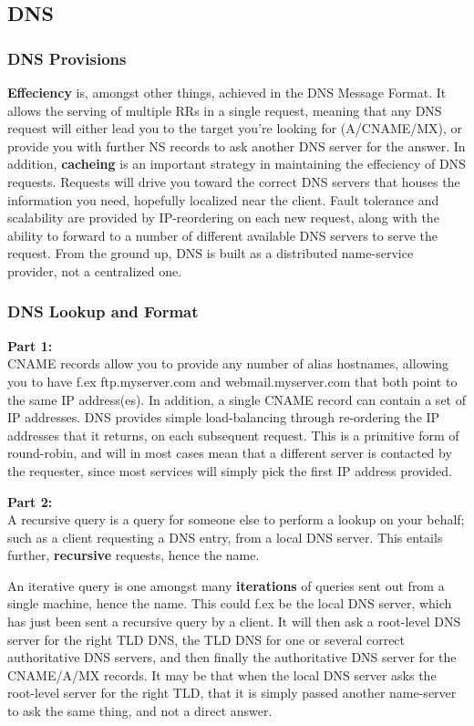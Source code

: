 \subsection{DNS}
\subsubsection{DNS Provisions}
\textbf{Effeciency} is, amongst other things, achieved in the DNS Message Format. It allows the serving of multiple RRs 
in a single request, meaning that any DNS request will either lead you to the target you're looking for (A/CNAME/MX), or
provide you with further NS records to ask another DNS server for the answer. In addition, \textbf{cacheing} is an important
strategy in maintaining the effeciency of DNS requests. Requests will drive you toward the correct DNS servers that
houses the information you need, hopefully localized near the client. Fault tolerance and scalability are provided by IP-reordering
on each new request, along with the ability to forward to a number of different available DNS servers to serve the request. From the ground
up, DNS is built as a distributed name-service provider, not a centralized one.

\subsubsection{DNS Lookup and Format}
\textbf{Part 1:}\\
CNAME records allow you to provide any number of alias hostnames, allowing you to have f.ex ftp.myserver.com and webmail.myserver.com
that both point to the same IP address(es). In addition, a single CNAME record can contain a set of IP addresses. DNS provides simple 
load-balancing through re-ordering the IP addresses that it returns, on each subsequent request. This is a primitive form of round-robin, 
and will in most cases mean that a different server is contacted by the requester, since most services will simply pick the first IP address
provided. 

\noindent \textbf{Part 2:}\\
A recursive query is a query for someone else to perform a lookup on your behalf; such as a client requesting a DNS entry, from a local DNS server.
This entails further, \textbf{recursive} requests, hence the name.

An iterative query is one amongst many \textbf{iterations} of queries sent out from a single machine, hence the name. This could f.ex be the
local DNS server, which has just been sent a recursive query by a client. It will then ask a root-level DNS server for the right TLD DNS, the
TLD DNS for one or several correct authoritative DNS servers, and then finally the authoritative DNS server for the CNAME/A/MX records. It may
be that when the local DNS server asks the root-level server for the right TLD, that it is simply passed another name-server to ask the same
thing, and not a direct answer.

